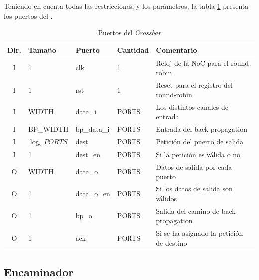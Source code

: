 Teniendo en cuenta todas las restricciones, y los parámetros, la tabla \ref{tab:crossbar_ports} presenta los puertos del .

\begin{table}[h]
    \centering
    \footnotesize
    \begin{tabular}{c|l|l|l|l}
         \hline
         Dir. & \textbf{Tamaño} & \textbf{Puerto} & \textbf{Cantidad} & \textbf{Comentario} \\\hline
         I & 1 & clk & 1 & Reloj de la NoC para el round-robin \\
         I & 1 & rst & 1 & Reset para el registro del round-robin \\
         I & WIDTH & data\_i & PORTS & Los distintos canales de entrada \\
         I & BP\_WIDTH & bp\_data\_i & PORTS & Entrada del back-propagation \\
         I & $\log_2 PORTS$ & dest & PORTS & Petición del puerto de salida \\
         I & 1 & dest\_en & PORTS & Si la petición es válida o no \\
         O & WIDTH & data\_o & PORTS & Datos de salida por cada puerto \\
         O & 1 & data\_o\_en & PORTS & Si los datos de salida son válidos \\
         O & 1 & bp\_o & PORTS & Salida del camino de back-propagation \\
         O & 1 & ack & PORTS & Si se ha asignado la petición de destino \\\hline
    \end{tabular}
    \caption{Puertos del \textit{Crossbar}}
    \label{tab:crossbar_ports}
\end{table}

\subsection{Encaminador}

